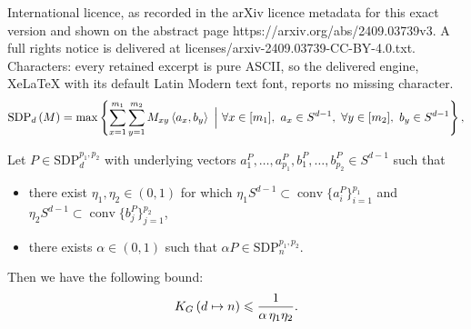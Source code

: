 \documentclass[10pt,a4paper]{amsart}
\DeclareMathOperator{\conv}{conv}
\newcommand\KG[2]{K_G\left({#1}\ifx#2\empty\else\mapsto\fi{#2}\right)}
\newcommand\cut[2]{\mathrm{SDP}_{#1}^{#2}}
\newcommand\sdp[2]{\mathrm{SDP}_{#1}\ifx#2\empty\else\left({#2}\right)\fi}
\newcommand{\innp}[2]{\left\langle{#1},{#2}\right\rangle}
\renewcommand{\leq}{\leqslant}
\begin{document}
International licence, as recorded in the arXiv licence metadata for this exact version and shown on the abstract page https://arxiv.org/abs/2409.03739v3. A full rights notice is delivered at licenses/arxiv-2409.03739-CC-BY-4.0.txt. Characters: every retained excerpt is pure ASCII, so the delivered engine, XeLaTeX with its default Latin Modern text font, reports no missing character.
\begin{equation}
  \sdp{d}{M}=\max\left\{\sum_{x=1}^{m_1}\sum_{y=1}^{m_2} M_{xy}\innp{a_x}{b_y}~\Big|~\forall x\in[m_1],~a_x\in S^{d-1},~\forall y\in[m_2],~b_y\in S^{d-1}\right\},
  \label{eqn:SDPdM}
\end{equation}

\begin{proposition}
  Let $P\in\cut{d}{p_1,p_2}$ with underlying vectors $a_1^P,\ldots,a_{p_1}^P,b_1^P,\ldots,b_{p_2}^P\in S^{d-1}$ such that
  \begin{itemize}
    \item there exist $\eta_1,\eta_2\in(0,1)$ for which $\eta_1S^{d-1}\subset\conv\{a_i^P\}_{i=1}^{p_1}$ and $\eta_2S^{d-1}\subset\conv\{b_j^P\}_{j=1}^{p_2}$,
    \item there exists $\alpha\in(0,1)$ such that $\alpha P\in\cut{n}{p_1,p_2}$.
  \end{itemize}
  Then we have the following bound:
  \begin{equation}
    \KG{d}{n}\leq\frac{1}{\alpha\,\eta_1\eta_2}.
    \label{eqn:upper}
  \end{equation}
  \label{prop:upper}
\end{proposition}
\end{document}
